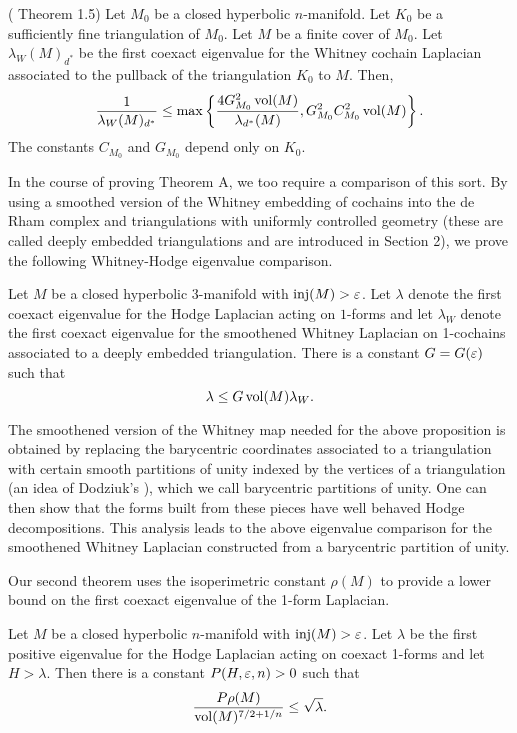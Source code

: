 {\begin{thm} (\cite{LS} Theorem 1.5)	 Let $M_0$ be a closed hyperbolic $n$-manifold. Let $K_0$ be a sufficiently fine triangulation of $M_0$. Let $M$ be a finite cover of $M_0.$ Let $\lambda_W(M)_{d^*}$ be the first coexact eigenvalue for the Whitney cochain Laplacian associated to the pullback of the triangulation $K_0$ to $M$. Then, $$\frac{1}{\lambda_W(M)_{d^*}}\leq \max\left\{\frac{4G_{M_0}^2\operatorname{vol}(M)}{\lambda_{d^*}(M)}, G_{M_0}^2C_{M_0}^2\operatorname{vol}(M)\right\}.$$
The constants $C_{M_0}$ and $G_{M_0}$ depend only on $K_0$.
\end{thm}

In the course of proving Theorem A, we too require a comparison of this sort. By using a smoothed version of the Whitney embedding of cochains into the de Rham complex and triangulations with uniformly controlled geometry (these are called deeply embedded triangulations and are introduced in Section 2), we prove the following Whitney-Hodge eigenvalue comparison.

\begin{thm} Let $M$ be a closed hyperbolic 3-manifold with $\operatorname{inj}(M)>\varepsilon$. Let $\lambda$ denote the first coexact eigenvalue for the Hodge Laplacian acting on $1$-forms and let $\lambda_W$ denote the first coexact eigenvalue for the smoothened Whitney Laplacian on 1-cochains associated to a deeply embedded triangulation. There is a constant $G = G(\varepsilon)$ such that $$\lambda \leq G \operatorname{vol}(M)\lambda_W.$$
\end{thm}

The smoothened version of the Whitney map needed for the above proposition is obtained by replacing the barycentric coordinates associated to a triangulation with certain smooth partitions of unity indexed by the vertices of a triangulation (an idea of Dodziuk’s \cite{dodzuik2}), which we call barycentric partitions of unity. One can then show that the forms built from these pieces have well behaved Hodge decompositions. This analysis leads to the above eigenvalue comparison for the smoothened Whitney Laplacian constructed from a barycentric partition of unity.

Our second theorem uses the isoperimetric constant $\rho(M)$ to provide a lower bound on the first coexact eigenvalue of the 1-form Laplacian.

\begin{bigthm} Let $M$ be a closed hyperbolic $n$-manifold with $\operatorname{inj}(M) > \varepsilon$. Let $\lambda$ be the first positive eigenvalue for the Hodge Laplacian acting on coexact 1-forms and let $H > \lambda$. Then there is a constant $P(H,\varepsilon,n)>0$ such that $$ \frac{P\rho(M)}{\operatorname{vol}(M)^{7/2+1/n}}\leq\sqrt{\lambda}.$$
\end{bigthm}

}
